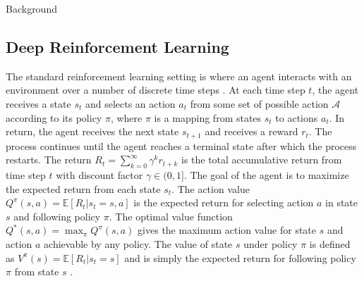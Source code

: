 \documentclass{article}
\begin{document}
\begin{section}{Background}
    \subsection{Deep Reinforcement Learning}
    The standard reinforcement learning setting is where an agent interacts with an environment over a number of discrete time steps \cite{DBLP:journals/corr/MnihBMGLHSK16}. At each time step $t$, the agent receives a state $s_t$ and selects an action $a_t$ from some set of possible action $\mathcal{A}$ according to its policy $\pi$, where $\pi$ is a mapping from states $s_t$ to actions $a_t$. In return, the agent receives the next state $s_{t+1}$ and receives a reward $r_t$. The process continues until the agent reaches a terminal state after which the process restarts. The return $R_t=\sum_{k=0}^{\infty}\gamma^kr_{t+k}$ is the total accumulative return from time step $t$ with discount factor $\gamma\in(0,1]$. The goal of the agent is to maximize the expected return from each state $s_t$. The action value $Q^{\pi}(s,a)=\mathbb{E}[R_t|s_t=s,a]$ is the expected return for selecting action $a$ in state $s$ and following policy $\pi$. The optimal value function $Q^*(s,a)=\max_{\pi}Q^{\pi}(s,a)$ gives the maximum action value for state $s$ and action $a$ achievable by any policy. The value of state $s$ under policy $\pi$ is defined as $V^{\pi}(s)=\mathbb{E}[R_t|s_t=s]$ and is simply the expected return for following policy $\pi$ from state $s$ \cite{DBLP:journals/corr/MnihBMGLHSK16}.
    

\end{section}
\end{document}
